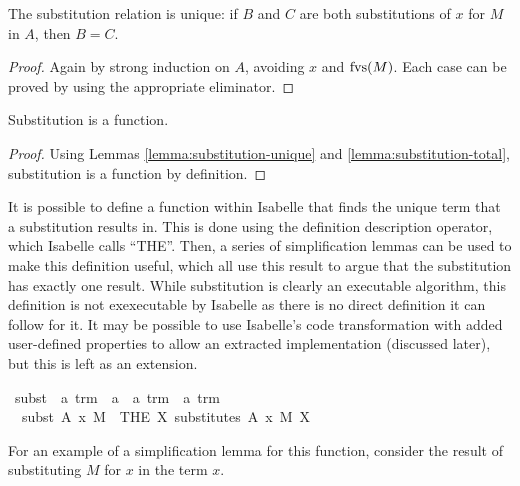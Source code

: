 \begin{lemma}
\label{lemma:substitution-unique}
The substitution relation is unique: if \(B\) and \(C\) are both substitutions of \(x\) for \(M\) in \(A\), then \(B = C\).
\end{lemma}
\begin{proof}
Again by strong induction on \(A\), avoiding \(x\) and \(\mathrm{fvs}(M)\).
Each case can be proved by using the appropriate eliminator.
\end{proof}

\begin{lemma}
Substitution is a function.
\end{lemma}
\begin{proof}
Using Lemmas \ref{lemma:substitution-unique} and \ref{lemma:substitution-total}, substitution is a function by definition.
\end{proof}

It is possible to define a function within Isabelle that finds the unique term that a substitution results in.
This is done using the definition description operator, which Isabelle calls ``THE''.
Then, a series of simplification lemmas can be used to make this definition useful, which all use this result to argue that the substitution has exactly one result.
While substitution is clearly an executable algorithm, this definition is not exexecutable by Isabelle as there is no direct definition it can follow for it.
It may be possible to use Isabelle's code transformation with added user-defined properties to allow an extracted implementation (discussed later), but this is left as an extension.

\begin{implementation}
\isamarkupfalse%
\ subst\ {\isacharcolon}{\isacharcolon}\ {\isachardoublequoteopen}{\isacharprime}a\ trm\ {\isasymRightarrow}\ {\isacharprime}a\ {\isasymRightarrow}\ {\isacharprime}a\ trm\ {\isasymRightarrow}\ {\isacharprime}a\ trm{\isachardoublequoteclose}\ {\isacharparenleft}{\isachardoublequoteopen}{\isacharunderscore}{\isacharbrackleft}{\isacharunderscore}\ {\isacharcolon}{\isacharcolon}{\isacharequal}\ {\isacharunderscore}{\isacharbrackright}{\isachardoublequoteclose}{\isacharparenright}\ \isanewline
\ \ {\isachardoublequoteopen}subst\ A\ x\ M\ {\isasymequiv}\ {\isacharparenleft}THE\ X{\isachardot}\ substitutes\ A\ x\ M\ X{\isacharparenright}{\isachardoublequoteclose}\isanewline
\end{implementation}

For an example of a simplification lemma for this function, consider the result of substituting \(M\) for \(x\) in the term \(x\).

